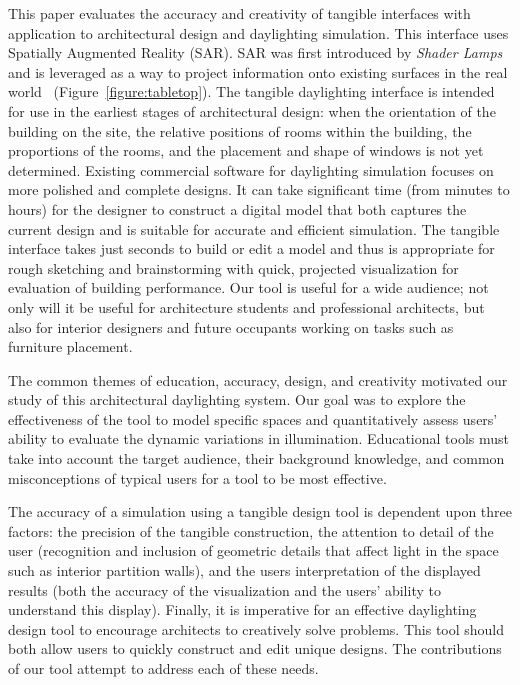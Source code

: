 \documentclass[preprint]{elsarticle}
\begin{document}
This paper evaluates the accuracy and creativity of tangible
interfaces with application to architectural
design and daylighting simulation.  This interface uses Spatially Augmented
Reality (SAR).  SAR was first introduced by \emph{Shader Lamps}
and is leveraged as a way to project information onto existing surfaces in the real
world~\cite{Raskar:2001:SLA, sheng_TVCG,ShengYYC09, 5543463} 
(Figure~\ref{figure:tabletop}).
%
The tangible daylighting interface is intended for use in the earliest
stages of architectural design: when the orientation of the building
on the site, the relative positions of rooms within the building, the
proportions of the rooms, and the placement and shape of windows is
not yet determined.  Existing commercial software for daylighting
simulation focuses on more polished and complete designs.  It can take
significant time (from minutes to hours) for the designer to construct
a digital model that both captures the current design and is suitable
for accurate and efficient simulation.  The tangible interface takes
just seconds to build or edit a model and thus is appropriate for
rough sketching and brainstorming with quick, projected visualization for
evaluation of building performance.  Our tool is useful
for a wide audience; not only will it be useful for architecture
students and professional architects, but also for interior designers
and future occupants working on tasks such as furniture placement.


The common themes of education, accuracy, design, and creativity
motivated our study of this architectural daylighting system.  Our
goal was to explore the effectiveness of the tool to model specific
spaces and quantitatively assess users' ability to evaluate the
dynamic variations in illumination.
%
Educational tools must take into account the target audience,
their background knowledge, and common misconceptions of typical users
for a tool to be most effective.

The accuracy of a simulation using a tangible design tool is dependent
upon three factors: the precision of the tangible construction, the
attention to detail of the user (recognition and inclusion of
geometric details that affect light in the space such as interior
partition walls), and the users interpretation of the displayed results
(both the accuracy of the visualization and the users' ability to
understand this display).  Finally, it is imperative for an effective
daylighting design tool to encourage architects to creatively solve
problems.  This tool should both allow users to quickly construct and
edit unique designs.  The contributions of our tool
attempt to address each of these needs.
\vspace{0.1in}
\end{document}
